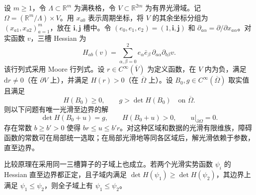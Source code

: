 设 $m\ge1$，令 $\Lambda\subset\mathbb R^m$ 为满秩格，令 $V\subset\mathbb R^{2m}$ 为有界光滑域。记 $\Omega=(\mathbb R^m/\Lambda)\times V$。用 $x_{a0}$ 表示周期坐标，将 $V$ 的其余坐标分组为 $(x_{a1},x_{a2})_{a=1}^m$，放在 $\mathbf i,\mathbf j$ 槽中。令 $(e_0,e_1,e_2)=(1,\mathbf i,\mathbf j)$ 和 $\partial_{a\alpha}=\partial/\partial x_{a\alpha}$。对实函数 $v$，三槽 Hessian 为
\[
H_{ab}(v)=\sum_{\alpha,\beta=0}^2e_\alpha\bar e_\beta\,\partial_{a\alpha}\partial_{b\beta}v .
\]
该行列式采用 Moore 行列式。设 $r\in C^\infty(\overline V)$ 为定义函数，在 $V$ 内为负，满足 $\mathrm dr\ne0$（在 $\partial V$ 上），并满足 $H(r)>0$（在 $\overline\Omega$ 上）。设 $B_0,g\in C^\infty(\overline\Omega)$ 取实值且满足
\[
 H(B_0)\ge0,\qquad g>\det H(B_0)\quad\text{on }\overline\Omega .
\]
则以下问题有唯一光滑至边界的解
\[
 \det H(B_0+u)=g,\qquad H(B_0+u)>0,\qquad u|_{\partial\Omega}=0.
\]
存在常数 $b\ge b'>0$ 使得 $br\le u\le b'r$。对这种区域和数据的光滑有限维族，障碍函数的常数可在局部统一选取；在局部光滑地等同各区域后，解光滑依赖于参数，直至边界。

比较原理在采用同一三槽算子的子域上也成立。若两个光滑实势函数 $\psi_i$ 的 Hessian 直至边界都正定，且子域内满足 $\det H(\psi_1)\ge\det H(\psi_2)$，其边界上满足 $\psi_1\le\psi_2$，则全子域上有 $\psi_1\le\psi_2$。
